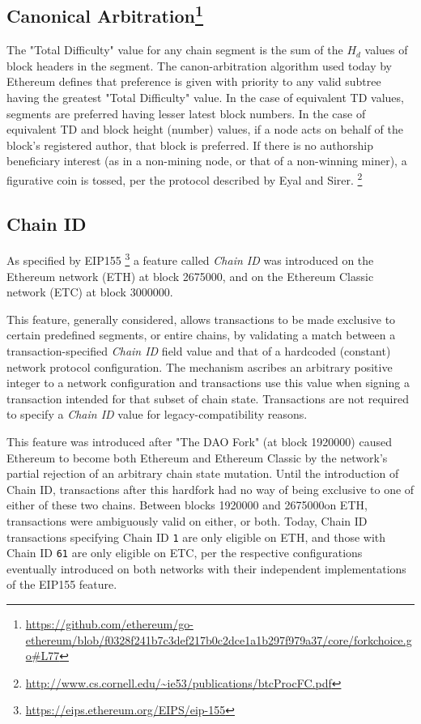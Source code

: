 \documentclass[11pt]{article}
\begin{document}
	\subsection{\small{Canonical Arbitration\footnote{\url{https://github.com/ethereum/go-ethereum/blob/f0328f241b7c3def217b0c2dce1a1b297f979a37/core/forkchoice.go#L77}}}}

	The "Total Difficulty" value for any chain segment is the sum of the $H_d$
	values of block headers in the segment.
	The canon-arbitration algorithm used today by Ethereum defines
	that preference is given with priority to any valid subtree having the greatest "Total Difficulty" value.
	In the case of equivalent TD values, segments are preferred having lesser latest block numbers.
	In the case of equivalent TD and block height (number) values, if a node acts
	on behalf of the block's registered author, that block is preferred.
	If there is no authorship beneficiary interest (as in a non-mining node, or
	that of a non-winning miner), a figurative coin is tossed, per the protocol
	described by Eyal and Sirer.\nolinebreak
	\footnote{\url{http://www.cs.cornell.edu/~ie53/publications/btcProcFC.pdf}}

	\subsection{\small{Chain ID}}

	As specified by EIP155\nolinebreak
	\footnote{\url{https://eips.ethereum.org/EIPS/eip-155}} a feature called
	\textit{Chain ID} was introduced on the Ethereum network (ETH) at block
	2675000, and on the Ethereum Classic network (ETC) at block 3000000.

	This feature, generally considered, allows transactions to be made exclusive to
	certain predefined segments, or entire chains, by validating a match between a
	transaction-specified \textit{Chain ID} field value and that of a hardcoded
	(constant) network protocol configuration.
	The mechanism ascribes an arbitrary positive integer to a network configuration
	and transactions use this value when signing a transaction intended for that
	subset of chain state.
	Transactions are not required to specify a \textit{Chain ID} value for
	legacy-compatibility reasons.

	This feature was introduced after "The DAO Fork" (at block 1920000) caused
	Ethereum to become both Ethereum and Ethereum Classic by the network's partial rejection of an arbitrary chain state mutation.
	Until the introduction of Chain ID, transactions after this hardfork had no way
	of being exclusive to one of either of these two chains.
	Between blocks 1920000 and 2675000on ETH, transactions were ambiguously valid on either, or both.
	Today, Chain ID transactions specifying Chain ID \texttt{1} are only eligible
	on ETH, and those with Chain ID \texttt{61} are only eligible on ETC, per the
	respective configurations eventually introduced on both networks with their
	independent implementations of the EIP155 feature.
\end{document}
